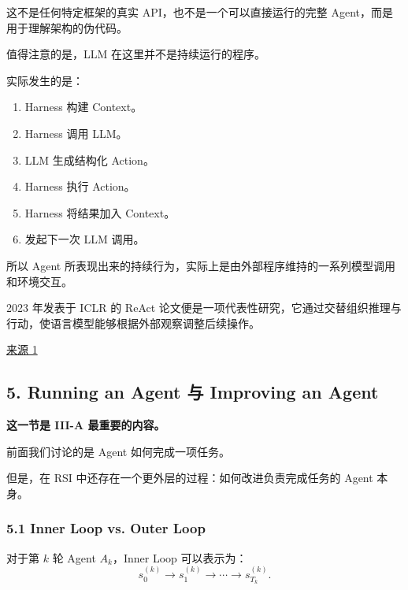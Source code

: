 这不是任何特定框架的真实 API，也不是一个可以直接运行的完整 Agent，而是用于理解架构的伪代码。

值得注意的是，LLM 在这里并不是持续运行的程序。

实际发生的是：

\begin{enumerate}
\def\labelenumi{\arabic{enumi}.}
\tightlist
\item
  Harness 构建 Context。
\item
  Harness 调用 LLM。
\item
  LLM 生成结构化 Action。
\item
  Harness 执行 Action。
\item
  Harness 将结果加入 Context。
\item
  发起下一次 LLM 调用。
\end{enumerate}

所以 Agent 所表现出来的持续行为，实际上是由外部程序维持的一系列模型调用和环境交互。

2023 年发表于 ICLR 的 ReAct 论文便是一项代表性研究，它通过交替组织推理与行动，使语言模型能够根据外部观察调整后续操作。

\href{https://arxiv.org/abs/2210.03629}{来源 1}

\hypertarget{part-3-31-0001-running-an-agent-ux4e0e-improving-an-agent}{%
\subsection{5. Running an Agent 与 Improving an Agent}\label{part-3-31-0001-running-an-agent-ux4e0e-improving-an-agent}}

\textbf{这一节是 III-A 最重要的内容。}

前面我们讨论的是 Agent 如何完成一项任务。

但是，在 RSI 中还存在一个更外层的过程：如何改进负责完成任务的 Agent 本身。

\hypertarget{part-3-31-0001-inner-loop-vs.-outer-loop}{%
\subsubsection{5.1 Inner Loop vs. Outer Loop}\label{part-3-31-0001-inner-loop-vs.-outer-loop}}


对于第 \(k\) 轮 Agent \(A_k\)，Inner Loop 可以表示为：
\[s_0^{(k)}
\rightarrow
s_1^{(k)}
\rightarrow
\cdots
\rightarrow
s_{T_k}^{(k)}.\]

